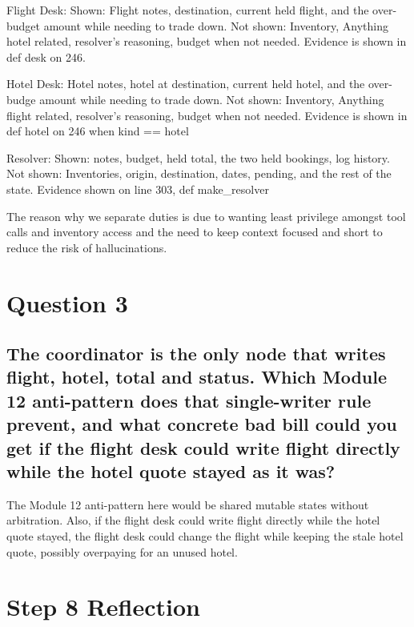 \documentclass[
  11pt,
  letterpaper,
  DIV=11,
  numbers=noendperiod]{scrartcl}
\begin{document}
Flight Desk: Shown: Flight notes, destination, current held flight, and
the over-budget amount while needing to trade down. Not shown:
Inventory, Anything hotel related, resolver's reasoning, budget when not
needed. Evidence is shown in def desk on 246.

Hotel Desk: Hotel notes, hotel at destination, current held hotel, and
the over-budge amount while needing to trade down. Not shown: Inventory,
Anything flight related, resolver's reasoning, budget when not needed.
Evidence is shown in def hotel on 246 when kind == hotel

Resolver: Shown: notes, budget, held total, the two held bookings, log
history. Not shown: Inventories, origin, destination, dates, pending,
and the rest of the state. Evidence shown on line 303, def
make\_resolver

The reason why we separate duties is due to wanting least privilege
amongst tool calls and inventory access and the need to keep context
focused and short to reduce the risk of hallucinations.

\section{Question 3}\label{question-3}

\subsection{The coordinator is the only node that writes flight, hotel,
total and status. Which Module 12 anti-pattern does that single-writer
rule prevent, and what concrete bad bill could you get if the flight
desk could write flight directly while the hotel quote stayed as it
was?}\label{the-coordinator-is-the-only-node-that-writes-flight-hotel-total-and-status.-which-module-12-anti-pattern-does-that-single-writer-rule-prevent-and-what-concrete-bad-bill-could-you-get-if-the-flight-desk-could-write-flight-directly-while-the-hotel-quote-stayed-as-it-was}

The Module 12 anti-pattern here would be shared mutable states without
arbitration. Also, if the flight desk could write flight directly while
the hotel quote stayed, the flight desk could change the flight while
keeping the stale hotel quote, possibly overpaying for an unused hotel.

\section{Step 8 Reflection}\label{step-8-reflection}
\end{document}
